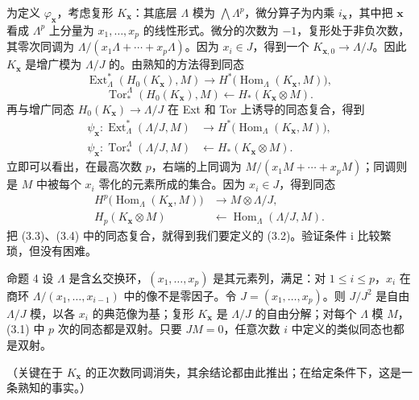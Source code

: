 为定义 $\varphi_{\mathbf x}$，考虑复形 $K_{\mathbf x}$：其底层 $\Lambda$ 模为 $\bigwedge\Lambda^p$，微分算子为内乘 $i_{\mathbf x}$，其中把 $\mathbf x$ 看成 $\Lambda^p$ 上分量为 $x_1,\ldots,x_p$ 的线性形式。微分的次数为 $-1$，复形处于非负次数，其零次同调为 $\Lambda/(x_1\Lambda+\cdots+x_p\Lambda)$。因为 $x_i\in J$，得到一个 $K_{\mathbf x,0}\to\Lambda/J$。因此 $K_{\mathbf x}$ 是增广模为 $\Lambda/J$ 的。由熟知的方法得到同态
\[
\operatorname{Ext}_{\Lambda}^{*}(H_0(K_{\mathbf x}),M)
\longrightarrow H^*\bigl(\operatorname{Hom}_{\Lambda}(K_{\mathbf x},M)\bigr),
\]
\[
\operatorname{Tor}^{\Lambda}_{*}(H_0(K_{\mathbf x}),M)
\longleftarrow H_*(K_{\mathbf x}\otimes M).
\]
再与增广同态 $H_0(K_{\mathbf x})\to\Lambda/J$ 在 Ext 和 Tor 上诱导的同态复合，得到
\begin{equation}
\begin{aligned}
\psi_{\mathbf x}:\operatorname{Ext}_{\Lambda}^{*}(\Lambda/J,M)
&\longrightarrow H^*\bigl(\operatorname{Hom}_{\Lambda}(K_{\mathbf x},M)\bigr),\\
\psi_{\mathbf x}:\operatorname{Tor}^{\Lambda}_{*}(\Lambda/J,M)
&\longleftarrow H_*(K_{\mathbf x}\otimes M).
\end{aligned}\tag{3.3}
\end{equation}
立即可以看出，在最高次数 $p$，右端的上同调为 $M/(x_1M+\cdots+x_pM)$；同调则是 $M$ 中被每个 $x_i$ 零化的元素所成的集合。因为 $x_i\in J$，得到同态
\begin{equation}
\begin{aligned}
H^p\bigl(\operatorname{Hom}_{\Lambda}(K_{\mathbf x},M)\bigr)&\longrightarrow M\otimes\Lambda/J,\\
H_p(K_{\mathbf x}\otimes M)&\longleftarrow\operatorname{Hom}_{\Lambda}(\Lambda/J,M).
\end{aligned}\tag{3.4}
\end{equation}
把 (3.3)、(3.4) 中的同态复合，就得到我们要定义的 (3.2)。验证条件 i 比较繁琐，但没有困难。

\begin{statement}{命题 4}
设 $\Lambda$ 是含幺交换环，$(x_1,\ldots,x_p)$ 是其元素列，满足：对 $1\leq i\leq p$，$x_i$ 在商环 $\Lambda/(x_1,\ldots,x_{i-1})$ 中的像不是零因子。令 $J=(x_1,\ldots,x_p)$。则 $J/J^2$ 是自由 $\Lambda/J$ 模，以各 $x_i$ 的典范像为基；复形 $K_{\mathbf x}$ 是 $\Lambda/J$ 的自由分解；对每个 $\Lambda$ 模 $M$，(3.1) 中 $p$ 次的同态都是双射。只要 $JM=0$，任意次数 $i$ 中定义的类似同态也都是双射。
\end{statement}
（关键在于 $K_{\mathbf x}$ 的正次数同调消失，其余结论都由此推出；在给定条件下，这是一条熟知的事实。）

